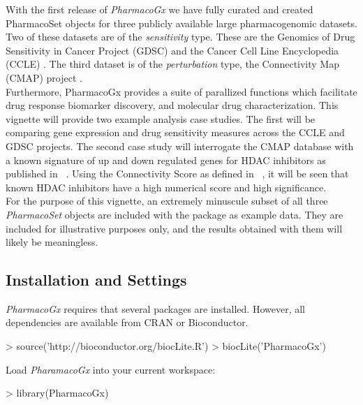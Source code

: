\documentclass[11pt]{article}
\begin{document}
With the first release of \textit{PharmacoGx} we have fully curated and
created PharmacoSet objects for three publicly available large pharmacogenomic
datasets. Two of these datasets are of the \textit{sensitivity} type. These
are the Genomics of Drug Sensitivity in Cancer Project (GDSC) \cite{garnett_systematic_2012} and the Cancer 
Cell Line Encyclopedia (CCLE) \cite{barretina_cancer_2012}. The third dataset is of the
\textit{perturbation} type, the Connectivity Map (CMAP) project
\cite{lamb_connectivity_2006}.\\

Furthermore, PharmacoGx provides a suite of parallized functions which
facilitate drug response biomarker discovery, and molecular drug
characterization. This vignette will provide two example analysis case
studies. The first will be comparing gene expression and drug sensitivity
measures across the CCLE and GDSC projects. The second case study will
interrogate the CMAP database with a known signature of up and down regulated
genes for HDAC inhibitors as published in ~\cite{glaser_gene_2003}. Using the
Connectivity Score as defined in ~\cite{lamb_connectivity_2006}, it will be seen that
known HDAC inhibitors have a high numerical score and high significance.\\ 

For the purpose of this vignette, an extremely minuscule subset of all three
\textit{PharmacoSet} objects are included with the package as example data.
They are included for illustrative purposes only, and the results obtained
with them will likely be meaningless.\\


\subsection{Installation and Settings}

\textit{PharmacoGx} requires that several packages are installed. However, all dependencies are available from CRAN or Bioconductor.

\begin{Schunk}
\begin{Sinput}
> source('http://bioconductor.org/biocLite.R')
> biocLite('PharmacoGx')
\end{Sinput}
\end{Schunk}

Load \textit{PharamacoGx} into your current workspace:
\begin{Schunk}
\begin{Sinput}
> library(PharmacoGx)
\end{Sinput}
\end{Schunk}
\end{document}
